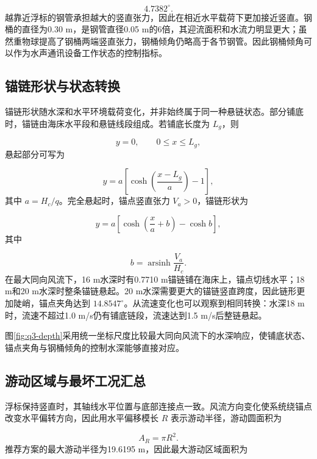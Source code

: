 \documentclass[UTF8,zihao=-4,a4paper,fontset=fandol]{ctexart}
\begin{document}
\[
4.7382^\circ.
\]
越靠近浮标的钢管承担越大的竖直张力，因此在相近水平载荷下更加接近竖直。钢桶的直径为0.30 m，是钢管直径0.05 m的6倍，其迎流面积和水流力明显更大；虽然重物球提高了钢桶两端竖直张力，钢桶倾角仍略高于各节钢管。因此钢桶倾角可以作为水声通讯设备工作状态的控制指标。

\subsection{锚链形状与状态转换}
锚链形状随水深和水平环境载荷变化，并非始终属于同一种悬链状态。部分铺底时，锚链由海床水平段和悬链线段组成。若铺底长度为 \(L_g\)，则

\[
y=0,\qquad 0\le x\le L_g,
\]
悬起部分可写为

\[
y=a\left[
\cosh\left(\frac{x-L_g}{a}\right)-1
\right], \tag{16}
\]
其中 \(a=H_c/q\)。完全悬起时，锚点竖直张力 \(V_a>0\)，锚链形状为

\[
y=a\left[
\cosh\left(\frac{x}{a}+b\right)-\cosh b
\right], \tag{17}
\]
其中

\[
b=\operatorname{arsinh}\frac{V_a}{H_c}.
\]
在最大同向风流下，16 m水深时有0.7710 m锚链铺在海床上，锚点切线水平；18 m和20 m水深时整条锚链悬起。20 m水深需要更大的锚链竖直跨度，因此链形更加陡峭，锚点夹角达到 \(14.8547^\circ\)。从流速变化也可以观察到相同转换：水深18 m时，流速不超过1.0 m/s仍有铺底链段，流速达到1.5 m/s后整链悬起。

图\ref{fig:q3-depth}采用统一坐标尺度比较最大同向风流下的水深响应，使铺底状态、锚点夹角与钢桶倾角的控制水深能够直接对应。

\subsection{游动区域与最坏工况汇总}
浮标保持竖直时，其轴线水平位置与底部连接点一致。风流方向变化使系统绕锚点改变水平偏转方向，因此用水平偏移模长 \(R\) 表示游动半径，游动圆面积为

\[
A_R=\pi R^2. \tag{18}
\]
推荐方案的最大游动半径为19.6195 m，因此最大游动区域面积为
\end{document}
